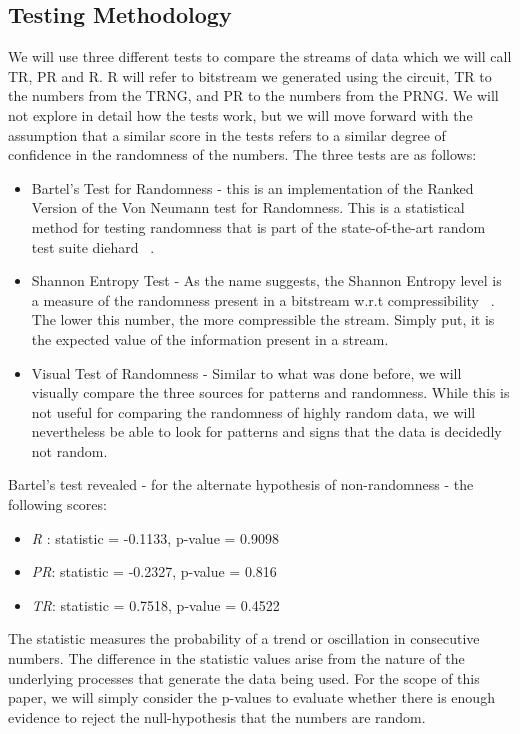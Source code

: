 \documentclass[jou,apacite]{apa6}
\begin{document}
\subsection{Testing Methodology}
We will use three different tests to compare the streams of data which we will call TR, PR and R. R will refer to bitstream we generated using the circuit, TR to the numbers from the TRNG, and PR to the numbers from the PRNG. We will not explore in detail how the tests work, but we will move forward with the assumption that a similar score in the tests refers to a similar degree of confidence in the randomness of the numbers. The three tests are as follows:

\begin{itemize}
\item Bartel's Test for Randomness - this is an implementation of the Ranked Version of the Von Neumann test for Randomness. This is a statistical method for testing randomness that is part of the state-of-the-art random test suite diehard ~\cite{bart}.
\item Shannon Entropy Test - As the name suggests, the Shannon Entropy level is a measure of the randomness present in a bitstream w.r.t compressibility ~\cite{shan}. The lower this number, the more compressible the stream. Simply put, it is the expected value of the information present in a stream.
\item Visual Test of Randomness - Similar to what was done before, we will visually compare the three sources for patterns and randomness. While this is not useful for comparing the randomness of highly random data, we will nevertheless be able to look for patterns and signs that the data is decidedly not random.
\end{itemize}

Bartel's test revealed - for the alternate hypothesis of non-randomness - the following scores:
\begin{itemize}
\item \emph{R} : statistic = -0.1133, p-value = 0.9098
\item \emph{PR}: statistic = -0.2327, p-value = 0.816
\item \emph{TR}: statistic = 0.7518, p-value = 0.4522
\end{itemize}
The statistic measures the probability of a trend or oscillation in consecutive numbers. The difference in the statistic values arise from the nature of the underlying processes that generate the data being used. For the scope of this paper, we will simply consider the p-values to evaluate whether there is enough evidence to reject the null-hypothesis that the numbers are random.
\end{document}
